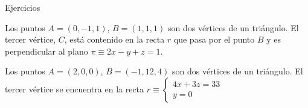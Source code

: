 \documentclass[addpoints,spanish, 12pt,a4paper]{exam}
\begin{document}
\begin{questions}




Ejercicios


\question Los puntos $A= (0,-1,1)$, $B= (1,1,1)$ son dos vértices de un triángulo. El tercer vértice, $C$, está contenido en la recta $r$ que pasa por el punto $B$ y es perpendicular al plano $\pi \equiv 2x - y + z = 1$. 

\question Los puntos $A = (2, 0, 0)$, $B = (-1, 12, 4)$ son dos vértices de un triángulo. El tercer vértice se encuentra en la recta $r\equiv \left\{\begin{matrix}
    4x+3z= 33 \\
    y=0
\end{matrix}\right.$
\end{questions}
\end{document}
